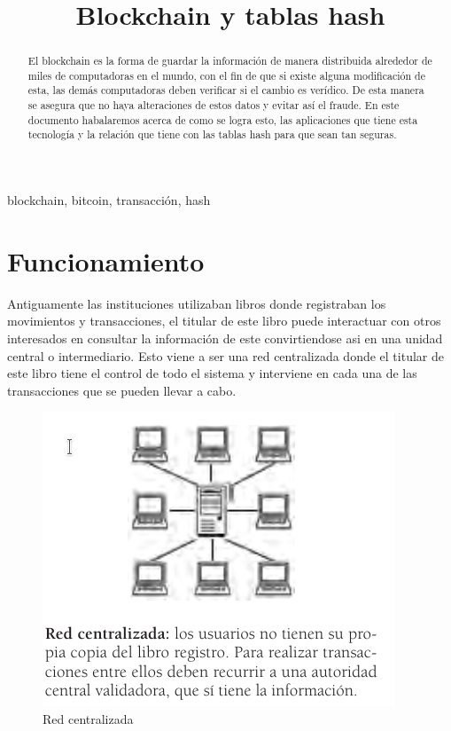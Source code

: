 \documentclass[conference]{IEEEtran}
\begin{document}
\title{Blockchain y tablas hash}

\author{
}

\maketitle

\begin{abstract}
    El blockchain es la forma de guardar la información de manera distribuida alrededor de miles de computadoras en el mundo, con el fin de que si existe alguna modificación de esta, las demás computadoras deben verificar si el cambio es verídico. De esta manera se asegura que no haya alteraciones de estos datos y evitar así el fraude. En este documento habalaremos acerca de como se logra esto, las aplicaciones que tiene esta tecnología y la relación que tiene con las tablas hash para que sean tan seguras.
\end{abstract}

\begin{IEEEkeywords}
    blockchain, bitcoin, transacción, hash
\end{IEEEkeywords}

\section{Funcionamiento}

Antiguamente las instituciones utilizaban libros donde registraban los movimientos y transacciones, el titular de este libro puede interactuar con otros interesados en consultar la información de este convirtiendose asi en una unidad central o intermediario. Esto viene a ser una red centralizada donde el titular de este libro tiene el control de todo el sistema y interviene en cada una de las transacciones que se pueden llevar a cabo.

\begin{figure}[htbp]
    \centering
    \includegraphics[scale=.8]{assets/images/red-centralizada.png}
    \caption{Red centralizada}
\end{figure}
\end{document}
